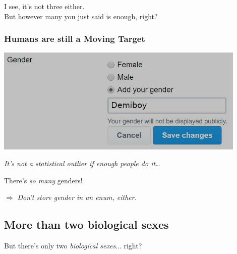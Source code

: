 \documentclass[aspectratio=169,x11names]{beamer}
\begin{document}
\begin{frame}
\begin{center}
\huge
I see, it's not three either.\\
But however many you just said is enough, right?
\end{center}
\end{frame}

\begin{frame}
\frametitle{Humans are still a Moving Target}
\begin{center}
\includegraphics[width=0.9\textwidth,keepaspectratio]{images/statistical_outlier.jpg} 
\medskip

\Large \emph{It's not a statistical outlier if enough people do it\dots}
\end{center}
\end{frame}

\begin{frame}
\begin{center}
\huge
There's \emph{so many} genders!\medskip

\Large
$\Rightarrow$ \emph{Don't store gender in an enum, either.}
\end{center}
\end{frame}

\subsection{More than two biological sexes}

\begin{frame}
\begin{center}
\huge
But there's only two \emph{biological sexes}... right?
\end{center}
\end{frame}
\end{document}
